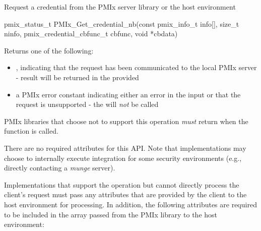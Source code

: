 \summary

Request a credential from the \ac{PMIx} server library or the host environment

\format

\cspecificstart
\begin{codepar}
pmix_status_t
PMIx_Get_credential_nb(const pmix_info_t info[], size_t ninfo,
                       pmix_credential_cbfunc_t cbfunc, void *cbdata)
\end{codepar}
\cspecificend

\begin{arglist}
\end{arglist}

Returns one of the following:

\begin{itemize}
    \item {}, indicating that the request has been communicated to the local \ac{PMIx} server - result will be returned in the provided 
    \item a \ac{PMIx} error constant indicating either an error in the input or that the request is unsupported - the  will \textit{not} be called
\end{itemize}

\reqattrstart
\ac{PMIx} libraries that choose not to support this operation \textit{must} return  when the function is called.

There are no required attributes for this \ac{API}. Note that implementations may choose to internally
execute integration for some security environments (e.g., directly
contacting a \textit{munge} server).

Implementations that support the operation but cannot directly process the client's request must pass any attributes that are provided by the client to the host environment for processing. In addition, the following attributes are required to be included in the  array passed from the \ac{PMIx} library to the host environment:


